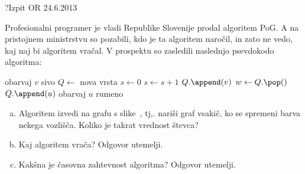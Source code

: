 \begin{naloga}{?}{Izpit OR 24.6.2013}
\begin{vprasanje}
Profesionalni programer je vladi Republike Slovenije
prodal algoritem {\sc PoG}.
A na pristojnem ministrstvu so pozabili, kdo je ta algoritem naročil,
in zato ne vedo, kaj naj bi algoritem vračal.
V prospektu so zasledili naslednjo psevdokodo algoritma:
\begin{small}
\begin{algorithmic}
    \State obarvaj $v$ sivo
\EndFor
\State $Q \gets$ nova vrsta
\State $s \gets 0$
        \State $s \gets s+1$
        \State $Q.\append(v)$
            \State $w \gets Q.\pop()$
                    \State $Q.\append(u)$
                    \State obarvaj $u$ rumeno
                \EndIf
            \EndFor
        \EndWhile
    \EndIf
\EndFor
\State {}
\end{algorithmic}
\end{small}

\begin{enumerate}[(a)]
\item Algoritem izvedi na grafu s slike~\fig{},
tj,. nariši graf vsakič, ko se spremeni barva nekega vozlišča.
Koliko je takrat vrednost števca?

\item Kaj algoritem vrača?
Odgovor utemelji.

\item Kakšna je časovna zahtevnost algoritma?
Odgovor utemelji.
\end{enumerate}

\begin{slika}
\pgfslika
{}
\end{slika}
\end{vprasanje}
\begin{odgovor}
\end{odgovor}
\end{naloga}
